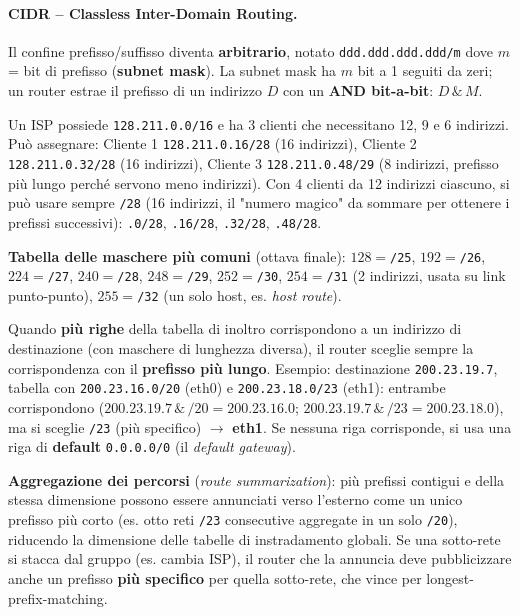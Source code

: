 \documentclass[12pt, a4paper]{article}
\begin{document}
\paragraph{CIDR -- Classless Inter-Domain Routing.} Il confine prefisso/suffisso diventa \textbf{arbitrario}, notato \texttt{ddd.ddd.ddd.ddd/m} dove $m$ = bit di prefisso (\textbf{subnet mask}). La subnet mask ha $m$ bit a 1 seguiti da zeri; un router estrae il prefisso di un indirizzo $D$ con un \textbf{AND bit-a-bit}: $D \,\&\, M$.

\begin{tcolorbox}[colback=orange!5, colframe=orange!70!black, title=\textbf{Esempio -- assegnazione CIDR}]
Un ISP possiede \texttt{128.211.0.0/16} e ha 3 clienti che necessitano 12, 9 e 6 indirizzi. Può assegnare: Cliente 1 \texttt{128.211.0.16/28} (16 indirizzi), Cliente 2 \texttt{128.211.0.32/28} (16 indirizzi), Cliente 3 \texttt{128.211.0.48/29} (8 indirizzi, prefisso più lungo perché servono meno indirizzi). Con 4 clienti da 12 indirizzi ciascuno, si può usare sempre \texttt{/28} (16 indirizzi, il "numero magico" da sommare per ottenere i prefissi successivi): \texttt{.0/28}, \texttt{.16/28}, \texttt{.32/28}, \texttt{.48/28}.
\end{tcolorbox}

\textbf{Tabella delle maschere più comuni} (ottava finale): $128{=}$\texttt{/25}, $192{=}$\texttt{/26}, $224{=}$\texttt{/27}, $240{=}$\texttt{/28}, $248{=}$\texttt{/29}, $252{=}$\texttt{/30}, $254{=}$\texttt{/31} (2 indirizzi, usata su link punto-punto), $255{=}$\texttt{/32} (un solo host, es. \textit{host route}).

\begin{tcolorbox}[colback=lightergray!10, colframe=tocsec, title=\textbf{Longest prefix matching}]
Quando \textbf{più righe} della tabella di inoltro corrispondono a un indirizzo di destinazione (con maschere di lunghezza diversa), il router sceglie sempre la corrispondenza con il \textbf{prefisso più lungo}. Esempio: destinazione \texttt{200.23.19.7}, tabella con \texttt{200.23.16.0/20} (eth0) e \texttt{200.23.18.0/23} (eth1): entrambe corrispondono ($200.23.19.7 \,\&\, /20 = 200.23.16.0$; $200.23.19.7 \,\&\, /23 = 200.23.18.0$), ma si sceglie \texttt{/23} (più specifico) $\to$ \textbf{eth1}. Se nessuna riga corrisponde, si usa una riga di \textbf{default} \texttt{0.0.0.0/0} (il \textit{default gateway}).
\end{tcolorbox}

\textbf{Aggregazione dei percorsi} (\textit{route summarization}): più prefissi contigui e della stessa dimensione possono essere annunciati verso l'esterno come un unico prefisso più corto (es. otto reti \texttt{/23} consecutive aggregate in un solo \texttt{/20}), riducendo la dimensione delle tabelle di instradamento globali. Se una sotto-rete si stacca dal gruppo (es. cambia ISP), il router che la annuncia deve pubblicizzare anche un prefisso \textbf{più specifico} per quella sotto-rete, che vince per longest-prefix-matching.
\end{document}
